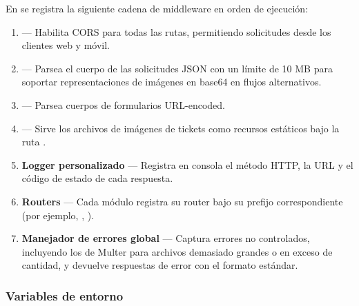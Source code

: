En  se registra la siguiente cadena de middleware
en orden de ejecución:

\begin{enumerate}
  \item {} — Habilita CORS para todas las rutas, permitiendo
    solicitudes desde los clientes web y móvil.
  \item {} — Parsea el cuerpo de
    las solicitudes JSON con un límite de 10 MB para soportar
    representaciones de imágenes en base64 en flujos alternativos.
  \item {} — Parsea cuerpos de formularios
    URL-encoded.
  \item {} — Sirve los archivos de
    imágenes de tickets como recursos estáticos bajo la ruta
    .
  \item \textbf{Logger personalizado} — Registra en consola el método
    HTTP, la URL y el código de estado de cada respuesta.
  \item \textbf{Routers} — Cada módulo registra su router bajo su
    prefijo correspondiente (por ejemplo, ,
    ).
  \item \textbf{Manejador de errores global} — Captura errores no
    controlados, incluyendo los de Multer para archivos demasiado
    grandes o en exceso de cantidad, y devuelve respuestas de error
    con el formato estándar.
\end{enumerate}

\subsubsection{Variables de entorno}

